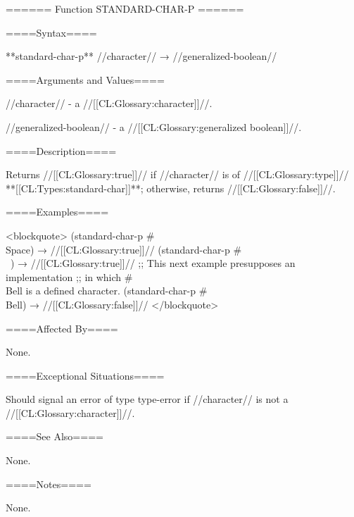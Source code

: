 ====== Function STANDARD-CHAR-P ======

====Syntax====

**standard-char-p** //character// → //generalized-boolean//

====Arguments and Values====

//character// - a //[[CL:Glossary:character]]//.

//generalized-boolean// - a //[[CL:Glossary:generalized boolean]]//.

====Description====

Returns //[[CL:Glossary:true]]// if //character// is of //[[CL:Glossary:type]]// **[[CL:Types:standard-char]]**; otherwise, returns //[[CL:Glossary:false]]//.

====Examples====

<blockquote> (standard-char-p #\\Space) → //[[CL:Glossary:true]]// (standard-char-p #\\~) → //[[CL:Glossary:true]]// ;; This next example presupposes an implementation ;; in which #\\Bell is a defined character. (standard-char-p #\\Bell) → //[[CL:Glossary:false]]// </blockquote>

====Affected By====

None.

====Exceptional Situations====

Should signal an error of type type-error if //character// is not a //[[CL:Glossary:character]]//.

====See Also====

None.

====Notes====

None.

